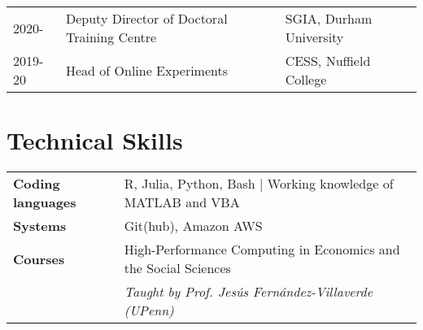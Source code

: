 \documentclass[11pt, a4paper]{article}
\begin{document}
 \begin{tabular}{lll}
   2020- & Deputy Director of Doctoral Training Centre & SGIA, Durham University \\
   2019-20 & Head of Online Experiments & CESS, Nuffield College \\
   
 \end{tabular}



 \section*{Technical Skills}
 \begin{tabular}{ll}
    \textbf{Coding languages} & R, Julia, Python, Bash $|$ Working knowledge of MATLAB and VBA \\
    \textbf{Systems} & Git(hub), Amazon AWS \\
    \textbf{Courses} & High-Performance Computing in Economics and the Social Sciences \\
    & \textit{Taught by Prof. Jesús Fernández-Villaverde (UPenn)} \\
     
 \end{tabular}
\end{document}
